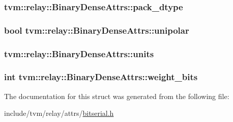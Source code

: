 \subsubsection[{\texorpdfstring{pack\+\_\+dtype}{pack_dtype}}]{ tvm\+::relay\+::\+Binary\+Dense\+Attrs\+::pack\+\_\+dtype}\hypertarget{structtvm_1_1relay_1_1BinaryDenseAttrs_a6aac82cbb3d54c5770fa035c0c9f81a2}{}\label{structtvm_1_1relay_1_1BinaryDenseAttrs_a6aac82cbb3d54c5770fa035c0c9f81a2}
\subsubsection[{\texorpdfstring{unipolar}{unipolar}}]{\setlength{\rightskip}{0pt plus 5cm}bool tvm\+::relay\+::\+Binary\+Dense\+Attrs\+::unipolar}\hypertarget{structtvm_1_1relay_1_1BinaryDenseAttrs_af21cdb9dac67ab9ecea5a19642658d8a}{}\label{structtvm_1_1relay_1_1BinaryDenseAttrs_af21cdb9dac67ab9ecea5a19642658d8a}
\subsubsection[{\texorpdfstring{units}{units}}]{ tvm\+::relay\+::\+Binary\+Dense\+Attrs\+::units}\hypertarget{structtvm_1_1relay_1_1BinaryDenseAttrs_a5373b2f2aac19653ae21aec74c69cdb0}{}\label{structtvm_1_1relay_1_1BinaryDenseAttrs_a5373b2f2aac19653ae21aec74c69cdb0}
\subsubsection[{\texorpdfstring{weight\+\_\+bits}{weight_bits}}]{\setlength{\rightskip}{0pt plus 5cm}int tvm\+::relay\+::\+Binary\+Dense\+Attrs\+::weight\+\_\+bits}\hypertarget{structtvm_1_1relay_1_1BinaryDenseAttrs_a6647c2d9d1d3108c6f552ff4271f2625}{}\label{structtvm_1_1relay_1_1BinaryDenseAttrs_a6647c2d9d1d3108c6f552ff4271f2625}


The documentation for this struct was generated from the following file\+:\begin{DoxyCompactItemize}
\item 
include/tvm/relay/attrs/\hyperlink{bitserial_8h}{bitserial.\+h}\end{DoxyCompactItemize}
